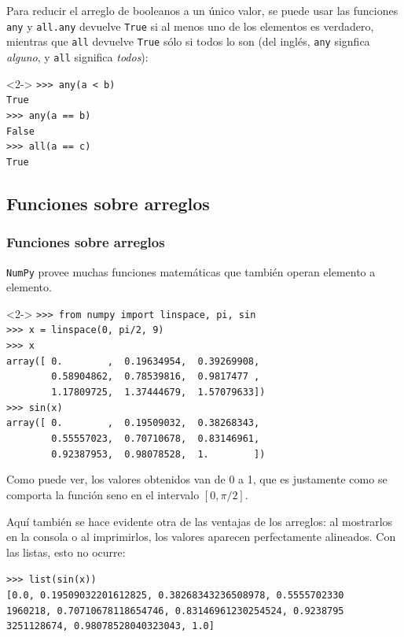 \begin{frame}[fragile]
Para reducir el arreglo de booleanos a un \'{u}nico valor, se puede usar las funciones \texttt{any} y \texttt{all.any} devuelve \texttt{True} si al menos uno de los elementos es verdadero, mientras que \texttt{all} devuelve \texttt{True} s\'{o}lo si todos lo son (del ingl\'{e}s, \texttt{any} signfica \textit{alguno}, y \texttt{all} significa \textit{todos}):
\begin{exampleblock}{}<2->
\verb|>>> any(a < b)| \\
\pause
\verb|True| \\
\pause
\verb|>>> any(a == b)| \\
\pause
\verb|False| \\
\pause
\verb|>>> all(a == c)| \\
\pause
\verb|True|
\end{exampleblock}
\end{frame}
\subsection{Funciones sobre arreglos}
\begin{frame}[fragile]
\frametitle{Funciones sobre arreglos}
\texttt{NumPy} provee muchas funciones matem\'{a}ticas que tambi\'{e}n operan elemento a elemento.
\begin{exampleblock}{}<2->
\verb|>>> from numpy import linspace, pi, sin| \\
\verb|>>> x = linspace(0, pi/2, 9)| \\
\fontsize{10}{10}\selectfont
\verb|>>> x| \\
\pause
\verb|array([ 0.        ,  0.19634954,  0.39269908,|\\ 
\verb|        0.58904862,  0.78539816,  0.9817477 ,|\\
\verb|        1.17809725,  1.37444679,  1.57079633])| \\
\verb|>>> sin(x)| \\
\pause
\verb|array([ 0.        ,  0.19509032,  0.38268343,| \\
\verb|        0.55557023,  0.70710678,  0.83146961,| \\
\verb|        0.92387953,  0.98078528,  1.        ])|
\end{exampleblock}
Como puede ver, los valores obtenidos van de 0 a 1, que es justamente como se comporta la función seno en el intervalo $[0, \pi/2]$.
\end{frame}
\begin{frame}[fragile]
Aqu\'{i} tambi\'{e}n se hace evidente otra de las ventajas de los arreglos: al mostrarlos en la consola o al imprimirlos, los valores aparecen perfectamente alineados. Con las listas, esto no ocurre:
\fontsize{12}{12}\selectfont
\begin{exampleblock}{}
\verb|>>> list(sin(x))| \\
\pause
\verb|[0.0, 0.19509032201612825, 0.38268343236508978, 0.5555702330| \\
\verb|1960218, 0.70710678118654746, 0.83146961230254524, 0.9238795| \\
\verb|3251128674, 0.98078528040323043, 1.0]|
\end{exampleblock}
\end{frame}
